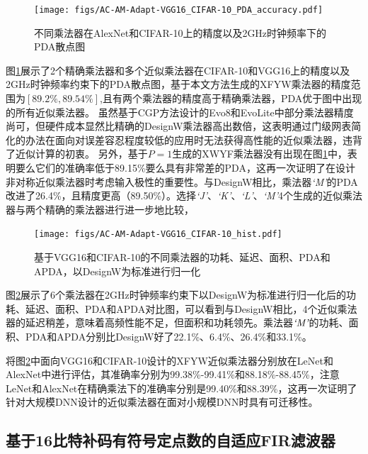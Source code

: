 \begin{figure}[!htb]
    \centering
    \texttt{[image: figs/AC-AM-Adapt-VGG16\_CIFAR-10\_PDA\_accuracy.pdf]}
    \caption{不同乘法器在AlexNet和CIFAR-10上的精度以及2GHz时钟频率下的PDA散点图}
    \label{AC:AM:Adapt:Fig:VGG16_CIFAR-10_PDA_accuracy}
\end{figure}

图\ref{AC:AM:Adapt:Fig:VGG16_CIFAR-10_PDA_accuracy}展示了2个精确乘法器和多个近似乘法器在CIFAR-10\cite{DNN:CIFAR-10}和VGG16\cite{DNN:AlexNet}上的精度以及2GHz时钟频率约束下的PDA散点图，基于本文方法生成的XFYW乘法器的精度范围为$[89.2\%, 89.54\%]$,且有两个乘法器的精度高于精确乘法器，PDA优于图中出现的所有近似乘法器。
虽然基于CGP方法设计的Evo8\cite{AC:AM:CGP_Evoapprox8b}和EvoLite\cite{AC:AM:CGP_EvoLite}中部分乘法器精度尚可，但硬件成本显然比精确的DesignW乘法器高出数倍，这表明通过门级网表简化的办法在面向对误差容忍程度较低的应用时无法获得高性能的近似乘法器，违背了近似计算的初衷。
另外，基于$P=1$生成的XWYF乘法器没有出现在图\ref{AC:AM:Adapt:Fig:VGG16_CIFAR-10_PDA_accuracy}中，表明要么它们的准确率低于89.15\%要么具有非常差的PDA，这再一次证明了在设计非对称近似乘法器时考虑输入极性的重要性。与DesignW相比，乘法器\emph{`M'}的PDA改进了26.4\%，且精度更高（89.50\%）。选择\emph{`J'}、\emph{`K'}、\emph{`L'}、\emph{`M'}4个生成的近似乘法器与两个精确的乘法器进行进一步地比较，
\begin{figure}[!htb]
    \centering
    \texttt{[image: figs/AC-AM-Adapt-VGG16\_CIFAR-10\_hist.pdf]}
    \caption{基于VGG16和CIFAR-10的不同乘法器的功耗、延迟、面积、PDA和APDA，以DesignW为标准进行归一化}
    \label{AC:AM:Adapt:Fig:VGG16_CIFAR-10_hist}
\end{figure}
图\ref{AC:AM:Adapt:Fig:VGG16_CIFAR-10_hist}展示了6个乘法器在2GHz时钟频率约束下以DesignW为标准进行归一化后的功耗、延迟、面积、PDA和APDA对比图，可以看到与DesignW相比，4个近似乘法器的延迟稍差，意味着高频性能不足，但面积和功耗领先。乘法器$\emph{`M'}$的功耗、面积、PDA和APDA分别比DesignW好了22.1\%、6.4\%、26.4\%和33.1\%。

将图\ref{AC:AM:Adapt:Fig:VGG16_CIFAR-10_hist}中面向VGG16和CIFAR-10设计的XFYW近似乘法器分别放在LeNet和AlexNet中进行评估，其准确率分别为99.38\%-99.41\%和88.18\%-88.45\%，注意LeNet和AlexNet在精确乘法下的准确率分别是99.40\%和88.39\%，这再一次证明了针对大规模DNN设计的近似乘法器在面对小规模DNN时具有可迁移性。


\subsection{基于16比特补码有符号定点数的自适应FIR滤波器}

